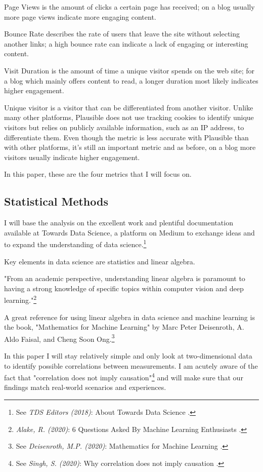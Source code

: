 Page Views is the amount of clicks a certain page has received; on a blog usually more page views indicate more engaging content.

Bounce Rate describes the rate of users that leave the site without selecting another links; a high bounce rate can indicate a lack of engaging or interesting content.

Visit Duration is the amount of time a unique visitor spends on the web site; for a blog which mainly offers content to read, a longer duration most likely indicates higher engagement.

Unique visitor is a visitor that can be differentiated from another visitor. Unlike many other platforms, Plausible does not use tracking cookies to identify unique visitors but relies on publicly available information, such as an IP address, to differentiate them. Even though the metric is less accurate with Plausible than with other platforms, it's still an important metric and as before, on a blog more visitors usually indicate higher engagement.

In this paper, these are the four metrics that I will focus on.

\subsection{Statistical Methods}

I will base the analysis on the excellent work and plentiful documentation available at Towards Data Science, a platform on Medium to exchange ideas and to expand the understanding of data science.\footnote{See \textit{TDS Editors (2018)}: About Towards Data Science .\cite{aboutTDS}}

Key elements in data science are statistics and linear algebra.

"From an academic perspective, understanding linear algebra is paramount to having a strong knowledge of specific topics within computer vision and deep learning."\footnote{\textit{Alake, R. (2020)}: 6 Questions Asked By Machine Learning Enthusiasts .\cite{sixQuestions}}

A great reference for using linear algebra in data science and machine learning is the book, "Mathematics for Machine Learning" by Marc Peter Deisenroth, A. Aldo Faisal, and Cheng Soon Ong.\footnote{See \textit{Deisenroth, M.P. (2020)}: Mathematics for Machine Learning .\cite{mathematicsML}}

In this paper I will stay relatively simple and only look at two-dimensional data to identify possible correlations between measurements. I am acutely aware of the fact that "correlation does not imply causation"\footnote{See \textit{Singh, S. (2020)}: Why correlation does not imply causation .\cite{correlateCause}} and will make sure that our findings match real-world scenarios and experiences.

